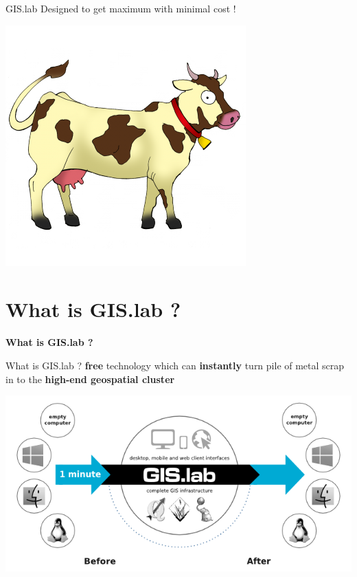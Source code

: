 \documentclass[12pt]{beamer}
\begin{document}
\begin{frame}{GIS.lab}
	Designed to get maximum with minimal cost !
	\begin{center}
		\includegraphics[keepaspectratio=true,height=0.6\textheight]{images/cow.png}
	\end{center}
\end{frame}


\section{What is GIS.lab ?}
\begin{frame}
	\begin{center}
		\LARGE\textbf{What is GIS.lab ?}
	\end{center}
\end{frame}

\begin{frame}{What is GIS.lab ?}
	\textbf{free} technology which can \textbf{instantly} turn pile of metal scrap in to the \textbf{high-end geospatial cluster}
	\begin{center}
		\includegraphics[keepaspectratio=true,height=0.5\textheight]{images/gislab-schema.png}
	\end{center}
\end{frame}
\end{document}
